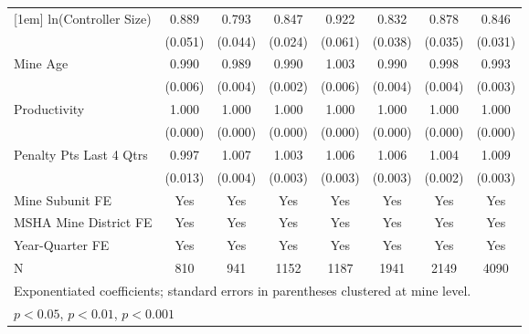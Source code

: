 {\begin{tabular}{l*{7}{c}}
[1em]
ln(Controller Size)      &       0.889\sym{*}  &       0.793\sym{***}&       0.847\sym{***}&       0.922         &       0.832\sym{***}&       0.878\sym{**} &       0.846\sym{***}\\
                         &     (0.051)         &     (0.044)         &     (0.024)         &     (0.061)         &     (0.038)         &     (0.035)         &     (0.031)         \\
[1em]
Mine Age                 &       0.990         &       0.989\sym{**} &       0.990\sym{***}&       1.003         &       0.990\sym{**} &       0.998         &       0.993\sym{**} \\
                         &     (0.006)         &     (0.004)         &     (0.002)         &     (0.006)         &     (0.004)         &     (0.004)         &     (0.003)         \\
[1em]
Productivity             &       1.000         &       1.000         &       1.000\sym{**} &       1.000         &       1.000         &       1.000\sym{*}  &       1.000         \\
                         &     (0.000)         &     (0.000)         &     (0.000)         &     (0.000)         &     (0.000)         &     (0.000)         &     (0.000)         \\
[1em]
Penalty Pts Last 4 Qtrs  &       0.997         &       1.007         &       1.003         &       1.006\sym{*}  &       1.006         &       1.004\sym{*}  &       1.009\sym{***}\\
                         &     (0.013)         &     (0.004)         &     (0.003)         &     (0.003)         &     (0.003)         &     (0.002)         &     (0.003)         \\
[1em]
Mine Subunit FE          &         Yes         &         Yes         &         Yes         &         Yes         &         Yes         &         Yes         &         Yes         \\
[1em]
MSHA Mine District FE    &         Yes         &         Yes         &         Yes         &         Yes         &         Yes         &         Yes         &         Yes         \\
[1em]
Year-Quarter FE          &         Yes         &         Yes         &         Yes         &         Yes         &         Yes         &         Yes         &         Yes         \\
\hline
N                        &         810         &         941         &        1152         &        1187         &        1941         &        2149         &        4090         \\
\hline\hline
\multicolumn{8}{l}{\footnotesize Exponentiated coefficients; standard errors in parentheses clustered at mine level.}\\
\multicolumn{8}{l}{\footnotesize \sym{*} \(p<0.05\), \sym{**} \(p<0.01\), \sym{***} \(p<0.001\)}\\
\end{tabular}
}
